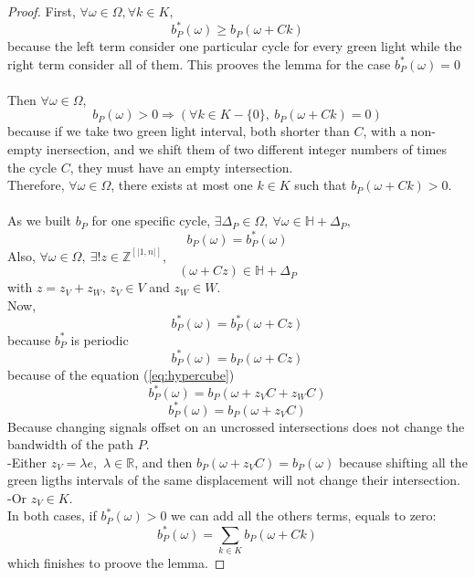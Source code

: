 \begin{proof}
First, $\forall \omega \in \Omega, \forall k \in K,$
\begin{equation}
b^*_P(\omega) \geq b_P(\omega + Ck)
\end{equation}
because the left term consider one particular cycle for every green light while the right term consider all of them. This prooves the lemma for the case $b^*_P(\omega) = 0$ \\ \\
Then $\forall \omega \in \Omega$,
\begin{equation*}
b_P(\omega) > 0 \Rightarrow (\forall k \in K-\{0\},~b_P(\omega + Ck) = 0)
\end{equation*}
because if we take two green light interval, both shorter than $C$, with a non-empty inersection, and we shift them of two different integer numbers of times the cycle $C$, they must have an empty intersection.\\
Therefore, $\forall \omega \in \Omega$, there exists at most one $k \in K$ such that $b_P(\omega + Ck) > 0$. \\ \\
As we built $b_P$ for one specific cycle, $\exists \Delta_P \in \Omega,~\forall \omega \in \mathbb{H}+\Delta_P,$
\begin{equation}
\label{eq:hypercube}
b_P(\omega) = b^*_P(\omega)
\end{equation}
Also, $\forall \omega \in \Omega,~\exists! z \in \mathbb{Z}^{[|1,n|]}$,
\begin{equation*}
(\omega + C z) \in \mathbb{H}+\Delta_P
\end{equation*}
with $z = z_V + z_W$, $z_V \in V$ and $z_W \in W$. \\
Now,
\begin{equation}
b^*_P(\omega) = b^*_P(\omega + Cz)
\end{equation}
because $b^*_P$ is periodic
\begin{equation}
b^*_P(\omega) = b_P(\omega + Cz)
\end{equation}
because of the equation (\ref{eq:hypercube})
\begin{equation*}
b^*_P(\omega) = b_P(\omega + z_V C + z_W C)
\end{equation*}
\begin{equation}
b^*_P(\omega) = b_P(\omega + z_V C)
\end{equation}
Because changing signals offset on an uncrossed intersections does not change the bandwidth of the path $P$. \\
-Either $z_V = \lambda e$,~$\lambda \in \mathbb{R}$, and then $b_P(\omega +z_V C) = b_P(\omega)$ because shifting all the green ligths intervals of the same displacement will not change their intersection.\\
-Or $z_V \in K$.\\
In both cases, if $b^*_P(\omega) > 0$ we can add all the others terms, equals to zero:\\
\begin{equation*}
b^*_P(\omega) = \sum\limits_{k \in K} b_P(\omega + Ck)
\end{equation*}
which finishes to proove the lemma.
\end{proof}

